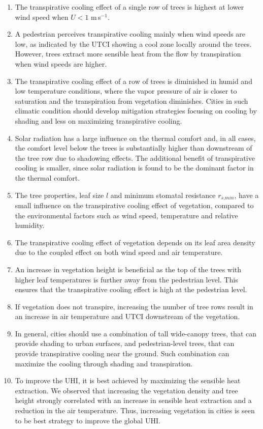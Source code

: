 \begin{enumerate}
\item The transpirative cooling effect of a single row of trees is highest at lower wind speed when $U<1$ m\,s$^{-1}$. 
\item A pedestrian perceives transpirative cooling mainly when wind speeds are low, as indicated by the UTCI showing a cool zone locally around the trees. However, trees extract more sensible heat from the flow by transpiration when wind speeds are higher.
\item The transpirative cooling effect of a row of trees is diminished in humid and low temperature conditions, where the vapor pressure of air is closer to saturation and the transpiration from vegetation diminishes. Cities in such climatic condition should develop mitigation strategies focusing on cooling by shading and less on maximizing transpirative cooling.
\item Solar radiation has a large influence on the thermal comfort and, in all cases, the comfort level below the trees is substantially higher than downstream of the tree row due to shadowing effects. The additional benefit of transpirative cooling is smaller, since solar radiation is found to be the dominant factor in the thermal comfort.  
\item The tree properties, leaf size $l$ and minimum stomatal resistance $r_{\textit{s,min}}$, have a small influence on the transpirative cooling effect of vegetation, compared to the environmental factors such as wind speed, temperature and relative humidity.
\item The transpirative cooling effect of vegetation depends on its leaf area density due to the coupled effect on both wind speed and air temperature. 
\item An increase in vegetation height is beneficial as the top of the trees with higher leaf temperatures is further away from the pedestrian level. This ensures that the transpirative cooling effect is high at the pedestrian level. 
\item If vegetation does not transpire, increasing the number of tree rows result in an increase in air temperature and UTCI downstream of the vegetation.  
\item In general, cities should use a combination of tall wide-canopy trees, that can provide shading to urban surfaces, and pedestrian-level trees, that can provide transpirative cooling near the ground. Such combination can maximize the cooling through shading and transpiration.
\item To improve the UHI, it is best achieved by maximizing the sensible heat extraction. We observed that increasing the vegetation density and tree height strongly correlated with an increase in sensible heat extraction and a reduction in the air temperature. Thus, increasing vegetation in cities is seen to be best strategy to improve the global UHI.
\end{enumerate}
